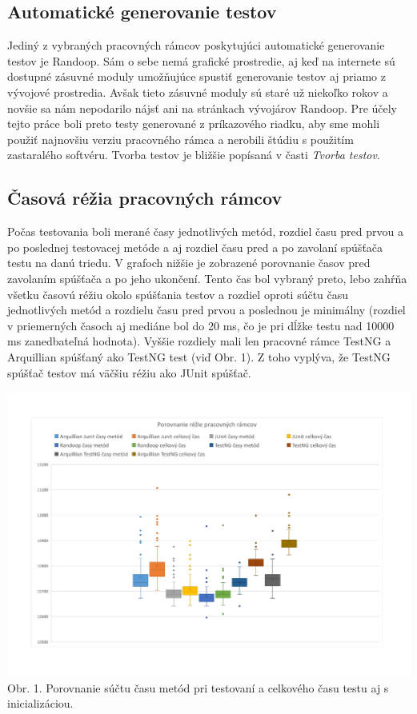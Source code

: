 \documentclass[11pt,twoside,slovak,a4paper]{article}
\begin{document}
	\subsection{Automatické generovanie testov}
	Jediný z vybraných pracovných rámcov poskytujúci automatické generovanie testov je Randoop. Sám o sebe nemá grafické prostredie, aj keď na internete sú dostupné zásuvné moduly umožňujúce spustiť generovanie testov aj priamo z vývojové prostredia. Avšak tieto zásuvné moduly sú staré už niekoľko rokov a novšie sa nám nepodarilo nájsť ani na stránkach vývojárov Randoop. Pre účely tejto práce boli preto testy generované z príkazového riadku, aby sme mohli použiť najnovšiu verziu pracovného rámca a nerobili štúdiu s použitím zastaralého softvéru. Tvorba testov je bližšie popísaná v časti \textit{Tvorba testov}.	
	
	\subsection{Časová réžia pracovných rámcov}
	Počas testovania boli merané časy jednotlivých metód, rozdiel času pred prvou a po poslednej testovacej metóde a aj rozdiel času pred a po zavolaní spúšťača testu na danú triedu. V grafoch nižšie je zobrazené porovnanie časov pred zavolaním spúšťača a po jeho ukončení. Tento čas bol vybraný preto, lebo zahŕňa všetku časovú réžiu okolo spúšťania testov a rozdiel oproti súčtu času jednotlivých metód a rozdielu času pred prvou a poslednou je minimálny (rozdiel v priemerných časoch aj mediáne bol do 20 ms, čo je pri dĺžke testu nad 10000 ms zanedbateľná hodnota). Vyššie rozdiely mali len pracovné rámce TestNG a Arquillian spúšťaný ako TestNG test (viď Obr. 1). Z toho vyplýva, že TestNG spúšťač testov má väčšiu réžiu ako JUnit spúšťač.
	
	\begin{center}
		\hspace*{-1.8cm} 
		\includegraphics[width = 500pt, trim = 0pt 50pt 0pt 50pt]{graf_rezia}
		\newline
		\tiny Obr. 1. Porovnanie súčtu času metód pri testovaní a celkového času testu aj s inicializáciou.
	\end{center}
	
\end{document}
